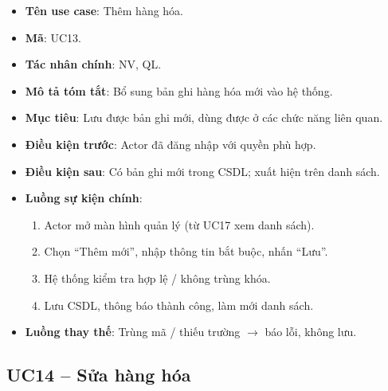 \begin{itemize}[leftmargin=1.5cm]
    \item \textbf{Tên use case}: Thêm hàng hóa.
    \item \textbf{Mã}: UC13.
    \item \textbf{Tác nhân chính}: NV, QL.
    \item \textbf{Mô tả tóm tắt}: Bổ sung bản ghi hàng hóa mới vào hệ thống.
    \item \textbf{Mục tiêu}: Lưu được bản ghi mới, dùng được ở các chức năng liên quan.
    \item \textbf{Điều kiện trước}: Actor đã đăng nhập với quyền phù hợp.
    \item \textbf{Điều kiện sau}: Có bản ghi mới trong CSDL; xuất hiện trên danh sách.
    \item \textbf{Luồng sự kiện chính}:
    \begin{enumerate}
        \item Actor mở màn hình quản lý (từ UC17 xem danh sách).
        \item Chọn ``Thêm mới'', nhập thông tin bắt buộc, nhấn ``Lưu''.
        \item Hệ thống kiểm tra hợp lệ / không trùng khóa.
        \item Lưu CSDL, thông báo thành công, làm mới danh sách.
    \end{enumerate}
    \item \textbf{Luồng thay thế}: Trùng mã / thiếu trường $\rightarrow$ báo lỗi, không lưu.
\end{itemize}


\subsection{UC14 -- Sửa hàng hóa}

